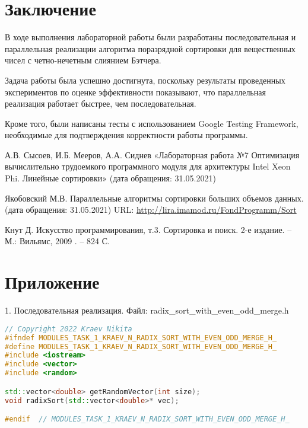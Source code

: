 \documentclass{report}
\begin{document}
\section*{Заключение}
В ходе выполнения лабораторной работы были разработаны последовательная и параллельная реализации алгоритма поразрядной сортировки для вещественных чисел с четно-нечетным слиянием Бэтчера.
\par Задача работы была успешно достигнута, поскольку результаты проведенных экспериментов по оценке эффективности показывают, что параллельная реализация работает быстрее, чем последовательная.
\par Кроме того, были написаны тесты с использованием Google Testing Framework, необходимые для подтверждения корректности работы программы.
\newpage

\begin{thebibliography}{1}
\item А.В. Сысоев, И.Б. Мееров, А.А. Сиднев «Лабораторная работа №7
Оптимизация вычислительно трудоемкого
программного модуля для архитектуры
Intel Xeon Phi. Линейные сортировки»  (дата обращения: 31.05.2021)
\item Якобовский М.В. Параллельные алгоритмы сортировки больших объемов данных. (дата обращения: 31.05.2021) \newline URL: \url {http://lira.imamod.ru/FondProgramm/Sort} 
\item Кнут Д. Искусство программирования, т.3. Сортировка и поиск. 2-е издание. – М.: Вильямс, 2009 . – 824 С.
\end{thebibliography}
\newpage

\section*{Приложение}
\par 1. Последовательная реализация. Файл: radix\_sort\_with\_even\_odd\_merge.h
\begin{lstlisting}[language=C++]
// Copyright 2022 Kraev Nikita
#ifndef MODULES_TASK_1_KRAEV_N_RADIX_SORT_WITH_EVEN_ODD_MERGE_H_
#define MODULES_TASK_1_KRAEV_N_RADIX_SORT_WITH_EVEN_ODD_MERGE_H_
#include <iostream>
#include <vector>
#include <random>

std::vector<double> getRandomVector(int size);
void radixSort(std::vector<double>* vec);

#endif  // MODULES_TASK_1_KRAEV_N_RADIX_SORT_WITH_EVEN_ODD_MERGE_H_
\end{lstlisting}
\end{document}
